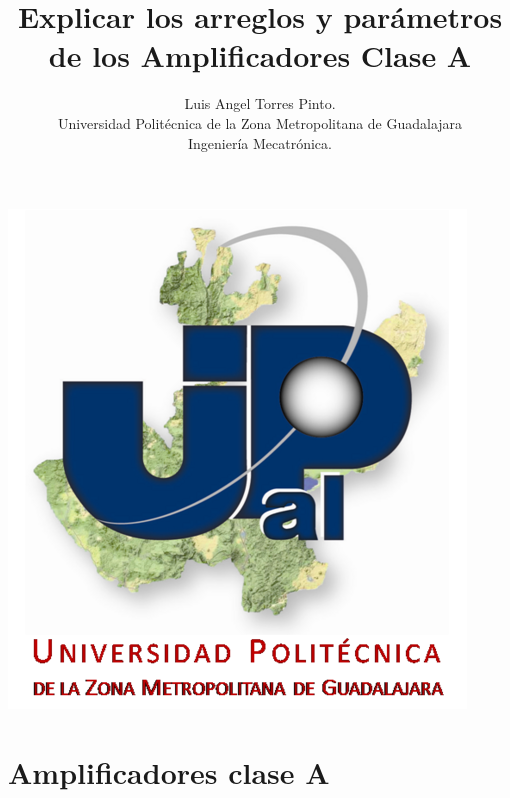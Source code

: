 \documentclass[10pt,a4paper]{article}
\author{Luis Angel Torres Pinto.\\Universidad Politécnica de la Zona Metropolitana de Guadalajara\\Ingeniería Mecatrónica. }
\title{Explicar los arreglos y parámetros de los Amplificadores Clase A}
\begin{document}
\maketitle
\centering
\includegraphics[scale=1.90]{upzmg.jpg}\\
\raggedright
\newpage
\section{Amplificadores clase A}
\end{document}
